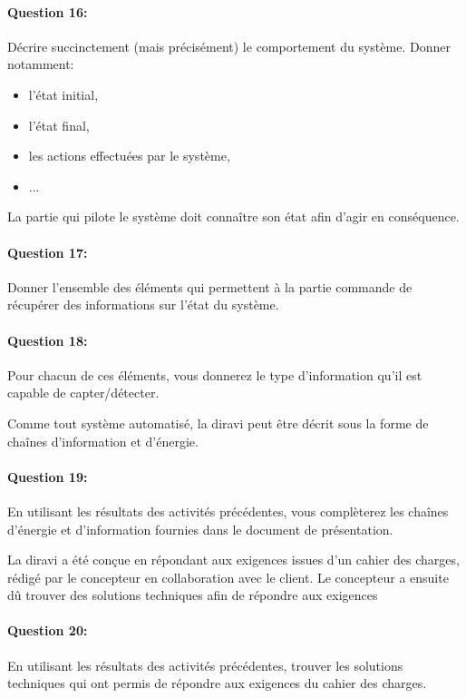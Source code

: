 \paragraph{Question 16:} Décrire succinctement (mais précisément) le comportement du système. Donner notamment:
\begin{itemize}
 \item l'état initial,
 \item l'état final,
 \item les actions effectuées par le système,
 \item ...
\end{itemize}


La partie qui pilote le système doit connaître son état afin d'agir en conséquence. 

\paragraph{Question 17:} Donner l'ensemble des éléments qui permettent à la partie commande de récupérer des informations sur l'état du système.

\paragraph{Question 18:} Pour chacun de ces éléments, vous donnerez le type d'information qu'il est capable de capter/détecter.


Comme tout système automatisé, la diravi peut être décrit sous la forme de chaînes d'information et d'énergie.

\paragraph{Question 19:} En utilisant les résultats des activités précédentes, vous complèterez les chaînes d'énergie et d'information fournies dans le document de présentation.

La diravi a été conçue en répondant aux exigences issues d'un cahier des charges, rédigé par le concepteur en collaboration avec le client. Le concepteur a ensuite dû trouver des solutions techniques afin de répondre aux exigences 

\paragraph{Question 20:} En utilisant les résultats des activités précédentes, trouver les solutions techniques qui ont permis de répondre aux exigences du cahier des charges.

